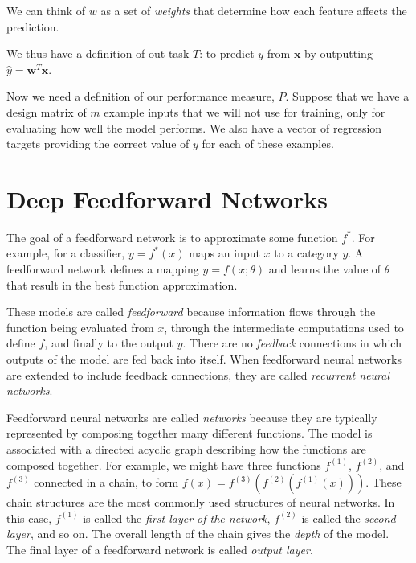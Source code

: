 \documentclass{report}
\begin{document}
We can think of $w$ as a set of \textit{weights} that determine how each feature affects the prediction.\newline

We thus have a definition of out task $T$: to predict $y$ from $\mathbf{x}$ by outputting $\hat{y}=\mathbf{w}^T\mathbf{x}$.\newline

Now we need a definition of our performance measure, $P$. Suppose that we have a design matrix of $m$ example inputs that we will not use for training, only for evaluating how well the model performs. We also have a vector of regression targets providing the correct value of $y$ for each of these examples. 

\chapter{Deep Feedforward Networks}
The goal of a feedforward network is to approximate some function $f^*$. For example, for a classifier, $y=f^*(x)$ maps an input $x$ to a category $y$. A feedforward network defines a mapping $y=f(x;\theta)$ and learns the value of $\theta$ that result in the best function approximation.\newline

\noindent These models are called \textit{feedforward} because information flows through the function being evaluated from $x$, through the intermediate computations used to define $f$, and finally to the output $y$. There are no \textit{feedback} connections in which outputs of the model are fed back into itself. When feedforward neural networks are extended to include  feedback connections, they are called \textit{recurrent neural networks}.\newline

\noindent Feedforward neural networks are called \textit{networks} because they are typically represented by composing together many different functions. The model is associated with a directed acyclic graph describing how the functions are composed together. For example, we might have three functions $f^{(1)}$, $f^{(2)}$, and $f^{(3)}$ connected in a chain, to form $f(x) = f^{(3)}(f^{(2)}(f^{(1)}(x)))$. These chain structures are the most commonly used structures of neural networks. In this case, $f^{(1)}$ is called the \textit{first layer of the network}, $f^{(2)}$ is called the \textit{second layer}, and so on. The overall length of the chain gives the \textit{depth} of the model. The final layer of a feedforward network is called \textit{output layer}.\newline
\end{document}
